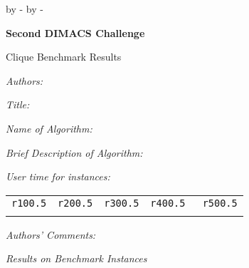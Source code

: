 % 
%
\topmargin 0pt
\advance \topmargin by -\headheight
\advance \topmargin by -\headsep
     
\textheight 8.9in
     
\oddsidemargin 0pt
\evensidemargin \oddsidemargin
\marginparwidth 0.5in
     
\textwidth 6.5in

\centerline{\bf Second DIMACS Challenge}
\centerline{Clique Benchmark Results}
\par
{\it Authors: }    \par
{\it Title: }      \par
{\it Name of Algorithm: }       \par
{\it Brief Description of Algorithm: } \par

\bigskip
{} \par
{} \par

\bigskip
{}

{\it User time for instances:}

\begin{center}
\begin{tabular}{rrrrr}\hline
{\tt r100.5}&{\tt r200.5}&{\tt r300.5}&{\tt r400.5}&{\tt
  r500.5}\\
   &   &   &  &   \\\hline
\end{tabular}
\end{center}

\bigskip
{}

{\it Authors' Comments:}
\newpage

{\it Results on Benchmark Instances}

